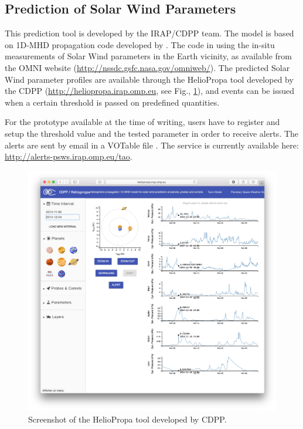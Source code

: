 \documentclass[referee,a4paper,12pt,traditabstract]{swsc}
\begin{document}
\begin{linenumbers}
 
\subsection{Prediction of Solar Wind Parameters}
This prediction tool is developed by the IRAP/CDPP team. The model is based on 1D-MHD propagation code developed by \cite{doi:10.1029/2004JA010959}. The code in using the in-situ measurements of Solar Wind parameters in the Earth vicinity, as available from the OMNI website (\url{http://nssdc.gsfc.nasa.gov/omniweb/}). The predicted Solar Wind parameter profiles are available through the HelioPropa tool developed by the CDPP (\url{http://heliopropa.irap.omp.eu}, see Fig., \ref{fig-heliopropa}), and events can be issued when a certain threshold is passed on predefined quantities. 

For the prototype available at the time of writing, users have to register and setup the threshold value and the tested parameter in order to receive alerts. The alerts are sent by email in a VOTable file \cite{2013ivoa.spec.0920O}. The service is currently available here: \url{http://alerts-psws.irap.omp.eu/tao}.

\begin{figure}
\includegraphics[width=\linewidth]{heliopropa.png}
\caption{Screenshot of the HelioPropa tool developed by CDPP.}
\label{fig-heliopropa}
\end{figure}


\end{linenumbers}
\end{document}
